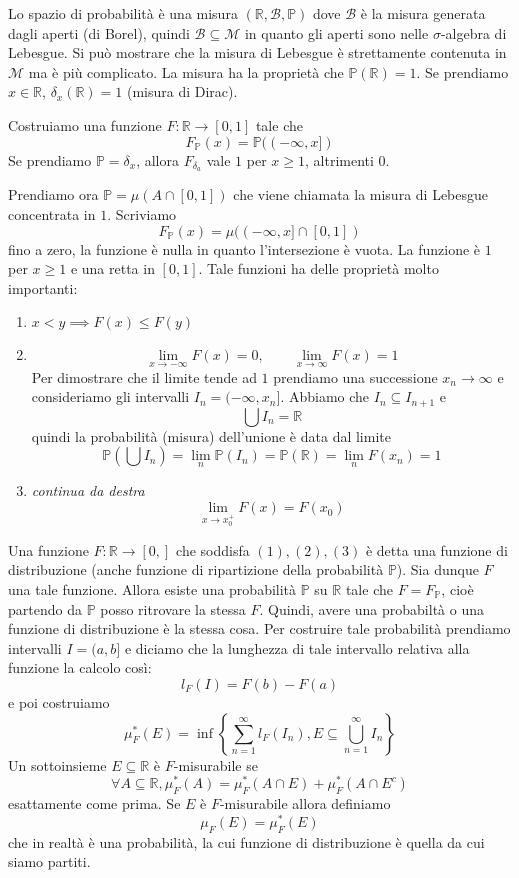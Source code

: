 \documentclass[a4paper]{article}
\begin{document}
Lo spazio di probabilità è una misura \((\mathbb{R}, \mathcal{B}, \mathbb{P})\)
dove \(\mathcal{B}\) è la misura generata dagli aperti (di Borel), quindi \(\mathcal{B} \subseteq \mathcal{M}\)
in quanto gli aperti sono nelle \(\sigma\)-algebra di Lebesgue.
Si può mostrare che la misura di Lebesgue è strettamente contenuta in \(\mathcal{M}\) ma è più complicato.
La misura ha la proprietà che \(\mathbb{P}(\mathbb{R}) = 1\).
Se prendiamo \(x\in \mathbb{R}\), \(\delta_x(\mathbb{R}) = 1\) (misura di Dirac).

Costruiamo una funzione \(F \colon \mathbb{R} \to [0,1]\) tale che
\[
    F_{\mathbb{P}}(x) = \mathbb{P}((-\infty, x])
\]
Se prendiamo \(\mathbb{P} = \delta_x\), allora
\(F_{\delta_a}\) vale \(1\) per \(x\geq 1\), altrimenti \(0\).

Prendiamo ora \(\mathbb{P} = \mu(A \cap [0,1])\) che viene chiamata la misura di Lebesgue concentrata in \(1\).
Scriviamo
\[
    F_{\mathbb{P}}(x) = \mu((-\infty, x] \cap [0,1])
\]
fino a zero, la funzione è nulla in quanto l'intersezione è vuota.
La funzione è \(1\) per \(x\geq1\) e una retta in \([0,1]\).
Tale funzioni ha delle proprietà molto importanti:
\begin{enumerate}
    \item \(x<y \implies F(x) \leq F(y)\)
    \item \[
        \lim_{x\to-\infty} F(x) = 0,\qquad \lim_{x\to\infty} F(x) = 1
    \]
    Per dimostrare che il limite tende ad \(1\) prendiamo una successione \(x_n \to \infty\) e consideriamo
    gli intervalli \(I_n = (-\infty, x_n]\).
    Abbiamo che \(I_n \subseteq I_{n+1}\) e
    \[
        \bigcup I_n = \mathbb{R}
    \]
    quindi la probabilità (misura) dell'unione è data dal limite
    \[
        \mathbb{P} \left(
            \bigcup I_n
        \right) = \lim_n \mathbb{P}(I_n) = \mathbb{P}(\mathbb{R})
        = \lim_n F(x_n) = 1
    \]
    \item \emph{continua da destra} \[
        \lim_{x\to x_0^+} F(x) = F(x_0)
    \]
\end{enumerate}

Una funzione \(F \colon \mathbb{R} \to [0,]\) che soddisfa \((1), (2), (3)\) è detta
una funzione di distribuzione (anche funzione di ripartizione della probabilità \(\mathbb{P}\)).
Sia dunque \(F\) una tale funzione. Allora esiste una probabilità \(\mathbb{P}\) su \(\mathbb{R}\)
tale che \(F = F_{\mathbb{P}}\), cioè partendo da \(\mathbb{P}\) posso ritrovare la stessa \(F\).
Quindi, avere una probabiltà o una funzione di distribuzione è la stessa cosa.
Per costruire tale probabilità prendiamo intervalli \(I = (a, b]\) e diciamo che la lunghezza
di tale intervallo relativa alla funzione la calcolo così:
\[
    l_F(I) = F(b) - F(a)
\]
e poi costruiamo
\[
    \mu^*_F(E) = \inf\left\{
        \sum_{n=1}^\infty l_F(I_n), E \subseteq \bigcup_{n=1}^\infty I_n
    \right\}
\]
Un sottoinsieme \(E \subseteq \mathbb{R}\) è \(F\)-misurabile
se
\[
    \forall A \subseteq \mathbb{R}, \mu_F^*(A) = \mu_F^*(A \cap E) + \mu^*_F(A \cap E^c)
\]
esattamente come prima.
Se \(E\) è \(F\)-misurabile allora definiamo
\[
    \mu_F(E) = \mu_F^*(E)
\]
che in realtà è una probabilità, la cui funzione di distribuzione è quella da cui siamo partiti.
\end{document}
